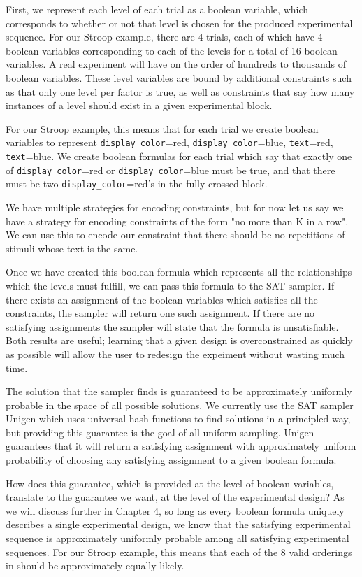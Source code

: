 First, we represent each level of each trial as a boolean variable, which corresponds to whether or not that level is chosen for the produced experimental sequence. For our Stroop example, there are 4 trials, each of which have 4 boolean variables corresponding to each of the levels for a total of 16 boolean variables. A real experiment will have on the order of hundreds to thousands of boolean variables. These level variables are bound by additional constraints such as that only one level per factor is true, as well as constraints that say how many instances of a level should exist in a given experimental block.

For our Stroop example, this means that for each trial we create boolean variables to represent \texttt{display\_color}=red, \texttt{display\_color}=blue, \texttt{text}=red, \texttt{text}=blue. We create boolean formulas for each trial which say that exactly one of \texttt{display\_color}=red or \texttt{display\_color}=blue must be true, and that there must be two \texttt{display\_color}=red's in the fully crossed block.

We have multiple strategies for encoding constraints, but for now let us say we have a strategy for encoding constraints of the form "no more than K in a row". We can use this to encode our constraint that there should be no repetitions of stimuli whose text is the same.

Once we have created this boolean formula which represents all the relationships which the levels must fulfill, we can pass this formula to the SAT sampler. If there exists an assignment of the boolean variables which satisfies all the constraints, the sampler will return one such assignment. If there are no satisfying assignments the sampler will state that the formula is unsatisfiable. Both results are useful; learning that a given design is overconstrained as quickly as possible will allow the user to redesign the expeiment without wasting much time.

The solution that the sampler finds is guaranteed to be approximately uniformly probable in the space of all possible solutions. We currently use the SAT sampler Unigen which uses universal hash functions to find solutions in a principled way, but providing this guarantee is the goal of all uniform sampling. Unigen guarantees that it will return a satisfying assignment with approximately uniform probability of choosing any satisfying assignment to a given boolean formula.

How does this guarantee, which is provided at the level of boolean variables, translate to the guarantee we want, at the level of the experimental design? As we will discuss further in Chapter 4, so long as every boolean formula uniquely describes a single experimental design, we know that the satisfying experimental sequence is approximately uniformly probable among all satisfying experimental sequences. For our Stroop example, this means that each of the 8 valid orderings in  should be approximately equally likely.

